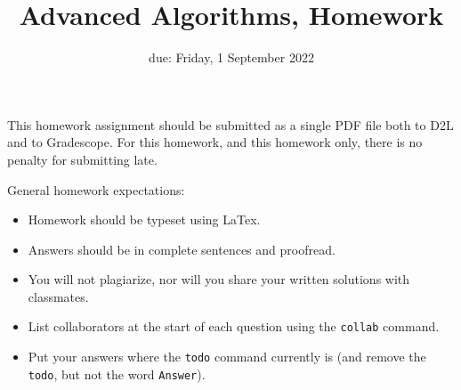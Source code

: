 \documentclass{article}
\title{Advanced Algorithms, Homework \hwnum}
\author{\todo{Your Name Here}}
\date{due: Friday, 1 September 2022}
\begin{document}
\maketitle

This homework assignment should be
submitted as a single PDF file both to D2L and to Gradescope.  For this
homework, and this homework only, there is no penalty for submitting late.

General homework expectations:
\begin{itemize}
    \item Homework should be typeset using LaTex.
    \item Answers should be in complete sentences and proofread.
    \item You will not plagiarize, nor will you share your written solutions
        with classmates.
    \item List collaborators at the start of each question using the
        \texttt{collab} command.
    \item Put your answers where the \texttt{todo} command currently is (and
        remove the \texttt{todo}, but not the word \texttt{Answer}).
\end{itemize}

\end{document}
